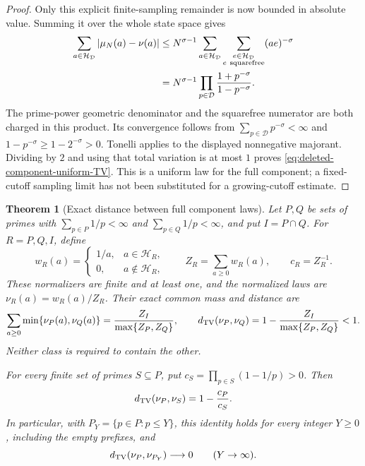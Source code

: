 \documentclass[11pt]{article}
\newtheorem{theorem}{Theorem}[section]
\theoremstyle{definition}
\begin{document}
\begin{proof}
Only this explicit finite-sampling remainder is now bounded in
absolute value. Summing it over the whole state space gives
\[
 \begin{aligned}
 \sum_{a\in\mathcal H_{\mathcal D}}|\mu_N(a)-\nu(a)|
 &\le N^{\sigma-1}
   \sum_{a\in\mathcal H_{\mathcal D}}
   \sum_{\substack{e\in\mathcal H_{\mathcal D}\\e\ {\rm squarefree}}}
                                      (ae)^{-\sigma}\\
 &=N^{\sigma-1}
       \prod_{p\in\mathcal D}
                    \frac{1+p^{-\sigma}}{1-p^{-\sigma}}.
 \end{aligned}
\]
The prime-power geometric denominator and the squarefree numerator
are both charged in this product.
Its convergence follows from
$\sum_{p\in\mathcal D}p^{-\sigma}<\infty$ and
$1-p^{-\sigma}\ge1-2^{-\sigma}>0$.
Tonelli applies to the displayed nonnegative majorant.
Dividing by $2$ and using that total variation is at most $1$
proves \eqref{eq:deleted-component-uniform-TV}.
This is a uniform law for the full component; a fixed-cutoff sampling
limit has not been substituted for a growing-cutoff estimate.
\end{proof}

\begin{theorem}[Exact distance between full component laws]
\label{thm:component-reference-exact-distance}
Let \(P,Q\) be sets of primes with
\(\sum_{p\in P}1/p<\infty\) and
\(\sum_{p\in Q}1/p<\infty\), and put \(I=P\cap Q\).
For \(R=P,Q,I\), define
\[
 w_R(a)=
 \begin{cases}
  1/a,&a\in\mathcal H_R,\\
  0,&a\notin\mathcal H_R,
 \end{cases}
 \qquad
 Z_R=\sum_{a\ge0}w_R(a),\qquad c_R=Z_R^{-1}.
\]
These normalizers are finite and at least one, and the normalized
laws are \(\nu_R(a)=w_R(a)/Z_R\). Their exact common mass and distance are
\begin{equation}
 \sum_{a\ge0}\min\{\nu_P(a),\nu_Q(a)\}
       =\frac{Z_I}{\max\{Z_P,Z_Q\}},\qquad
 d_{\rm TV}(\nu_P,\nu_Q)
       =1-\frac{Z_I}{\max\{Z_P,Z_Q\}}<1.
 \label{eq:component-reference-exact-distance}
\end{equation}
Neither class is required to contain the other.

For every finite set of primes \(S\subseteq P\), put
\(c_S=\prod_{p\in S}(1-1/p)>0\). Then
\begin{equation}
 d_{\rm TV}(\nu_P,\nu_S)=1-\frac{c_P}{c_S}.
 \label{eq:component-reference-finite-distance}
\end{equation}
In particular, with \(P_Y=\{p\in P:p\le Y\}\), this identity holds
for every integer \(Y\ge0\), including the empty prefixes, and
\[
 d_{\rm TV}(\nu_P,\nu_{P_Y})\longrightarrow0
                         \qquad(Y\to\infty).
\]
\end{theorem}
\end{document}
